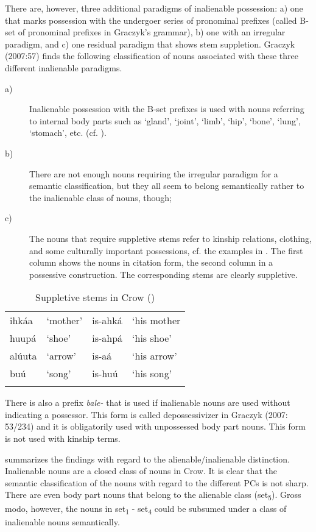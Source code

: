 \documentclass[output=paper]{LSP/langsci}
\begin{document}
There are, however, three additional paradigms of inalienable possession: a) one that marks possession with the undergoer series of pronominal prefixes (called B-set of pronominal prefixes in Graczyk's grammar), b) one with an irregular paradigm, and c) one residual paradigm that shows stem suppletion. Graczyk (2007:57) finds the following classification of nouns associated with these three different inalienable paradigms.

\begin{description}
\item[a)] Inalienable possession with the B-set prefixes is used with nouns referring to internal body parts such as `gland', `joint', `limb', `hip', `bone', `lung', `stomach', etc. (cf. \citealt[57]{Graczyk2007}).

\item[b)] There are not enough nouns requiring the irregular paradigm for a semantic classification, but they all seem to belong semantically rather to the inalienable class of nouns, though;

\item[c)] The nouns that require suppletive stems refer to kinship relations, clothing, and some culturally important possessions, cf. the examples in . The first column shows the nouns in citation form, the second column in a possessive construction. The corresponding stems are clearly suppletive. 
\end{description}

\begin{table}
\caption{Suppletive stems in Crow (\citealt[58]{Graczyk2007})} \label{crowsuppletion}
\begin{tabular}[h]{ l l l l}
\lsptoprule
 ihkáa	 & `mother'	& is-ahká	& `his mother \\
 huupá & `shoe' &  is-ahpá	 &  `his shoe'\\
alúuta &  `arrow' & is-aá &  `his arrow'\\
buú & `song'	&  is-huú & `his song'\\
\lspbottomrule
\end{tabular}
\end{table}

There is also a prefix \textit{bale-} that is used if inalienable nouns are used without indicating a possessor. This form is called depossessivizer in Graczyk (2007: 53/234) and it is obligatorily used with unpossessed body part nouns. This form is not used with kinship terms.

 summarizes the findings with regard to the alienable/inalienable distinction. Inalienable nouns are a closed class of nouns in Crow. It is clear that the semantic classification of the nouns with regard to the different PCs is not sharp. There are even body part nouns that belong to the alienable class (set\textsubscript{5}). Gross modo, however, the nouns in set\textsubscript{1} - set\textsubscript{4} could be subsumed under a class of inalienable nouns semantically.
\end{document}
